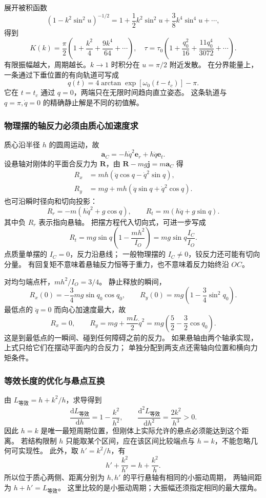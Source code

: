 \documentclass[UTF8,zihao=-4,fontset=fandol,a4paper]{ctexart}
\newcommand{\vect}[1]{\bm{#1}}
\newcommand{\dd}{\mathrm d}
\begin{document}
展开被积函数
\[
(1-k^2\sin^2u)^{-1/2}
=1+\frac12k^2\sin^2u+\frac38k^4\sin^4u+\cdots,
\]
得到
\[
K(k)=\frac\pi2\left(1+\frac{k^2}{4}+\frac{9k^4}{64}+\cdots\right),
\quad
\tau=\tau_0\left(1+\frac{q_0^2}{16}
+\frac{11q_0^4}{3072}+\cdots\right).
\]
有限振幅越大，周期越长。$k\to1$ 时积分在 $u=\pi/2$ 附近发散。
在分界能量上，一条通过下垂位置的有向轨道可写成
\[
q(t)=4\arctan\exp[\omega_0(t-t_c)]-\pi.
\]
它在 $t=t_c$ 通过 $q=0$，两端只在无限时间趋向直立姿态。
这条轨道与 $q=\pi,\dot q=0$ 的精确静止解是不同的初值解。

\subsubsection*{物理摆的轴反力必须由质心加速度求}
质心沿半径 $h$ 的圆周运动，故
\[
\vect a_C=-h\dot q^2\vect e_r+h\ddot q\vect e_t.
\]
设悬轴对刚体的平面合反力为 $\vect R$，由
$\vect R-mg\vect j=m\vect a_C$ 得
\begin{align*}
R_x&=mh(\ddot q\cos q-\dot q^2\sin q),\\
R_y&=mg+mh(\ddot q\sin q+\dot q^2\cos q).
\end{align*}
也可沿瞬时径向和切向投影：
\[
R_r=-m(h\dot q^2+g\cos q),\qquad
R_t=m(h\ddot q+g\sin q).
\]
其中负 $R_r$ 表示指向悬轴。
把摆方程代入切向式，可进一步写成
\[
R_t=mg\sin q\left(1-\frac{mh^2}{I_O}\right)
=mg\sin q\frac{I_C}{I_O}.
\]
点质量单摆的 $I_C=0$，反力沿悬线；
一般物理摆的 $I_C\ne0$，铰反力还可能有切向分量。
有回复矩不意味着悬轴反力恒等于重力，也不意味着反力始终沿 $OC$。

对均匀端点杆，$mh^2/I_O=3/4$。
静止释放的瞬间，
\[
R_x(0)=-\frac34mg\sin q_0\cos q_0,\qquad
R_y(0)=mg\left(1-\frac34\sin^2q_0\right).
\]
最低点的 $\ddot q=0$ 而向心加速度最大，故
\[
R_x=0,\qquad
R_y=mg+\frac{mL}{2}\dot q^2
=mg\left(\frac52-\frac32\cos q_0\right).
\]
这是到最低点的一瞬间、碰到任何障碍之前的反力。
如果悬轴由两个轴承实现，上式只给它们在摆动平面内的合反力；
单独分配到两支点还需轴向位置和横向力矩条件。

\subsubsection*{等效长度的优化与悬点互换}
由 $L_{\text{等效}}=h+k^2/h$，求导得到
\[
\frac{\dd L_{\text{等效}}}{\dd h}=1-\frac{k^2}{h^2},\qquad
\frac{\dd^2 L_{\text{等效}}}{\dd h^2}=\frac{2k^2}{h^3}>0.
\]
因此 $h=k$ 是唯一最短周期位置，但刚体上实际允许的悬点必须能达到这个距离。
若结构限制 $h$ 只能取某个区间，应在该区间比较端点与 $h=k$，不能忽略几何可实现性。
此外，取 $h'=k^2/h$，有
\[
h'+\frac{k^2}{h'}=h+\frac{k^2}{h}.
\]
所以位于质心两侧、距离分别为 $h,h'$ 的平行悬轴有相同的小振动周期，
两轴间距为 $h+h'=L_{\text{等效}}$。
这里比较的是小振动周期；大振幅还须指定相同的最大摆角。
\end{document}
